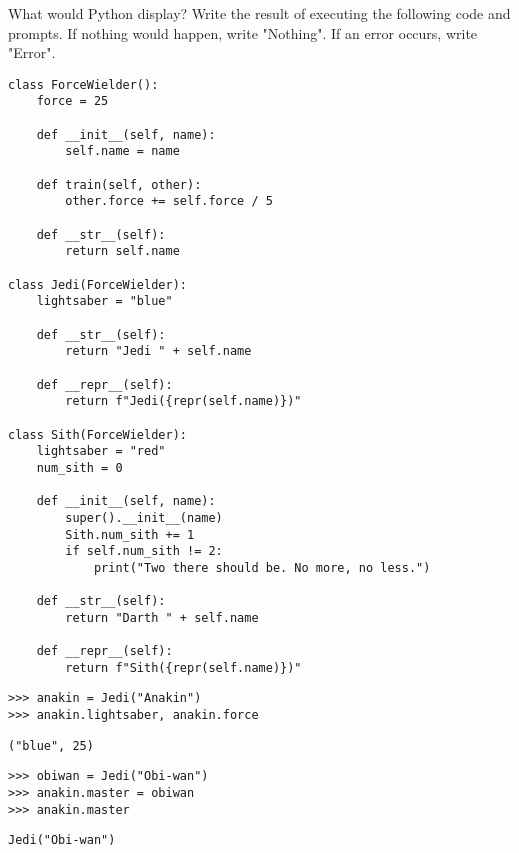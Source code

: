 \begin{blocksection}
\question What would Python display? Write the result of executing the following code and prompts. If nothing would happen, write "Nothing". If an error occurs, write "Error".

\begin{lstlisting}
class ForceWielder():
    force = 25

    def __init__(self, name):
        self.name = name

    def train(self, other):
        other.force += self.force / 5

    def __str__(self):
        return self.name

class Jedi(ForceWielder):
    lightsaber = "blue"

    def __str__(self):
        return "Jedi " + self.name

    def __repr__(self):
        return f"Jedi({repr(self.name)})"

class Sith(ForceWielder):
    lightsaber = "red"
    num_sith = 0

    def __init__(self, name):
        super().__init__(name)
        Sith.num_sith += 1
        if self.num_sith != 2:
            print("Two there should be. No more, no less.")
        
    def __str__(self):
        return "Darth " + self.name

    def __repr__(self):
        return f"Sith({repr(self.name)})"
\end{lstlisting}
\end{blocksection}

\newpage
\begin{lstlisting}
>>> anakin = Jedi("Anakin")
>>> anakin.lightsaber, anakin.force
\end{lstlisting}
\begin{solution}[.2in]
\begin{lstlisting}
("blue", 25)
\end{lstlisting}
\end{solution}

\begin{lstlisting}
>>> obiwan = Jedi("Obi-wan")
>>> anakin.master = obiwan
>>> anakin.master
\end{lstlisting}
\begin{solution}[.2in]
\begin{lstlisting}
Jedi("Obi-wan")
\end{lstlisting}
\end{solution}


